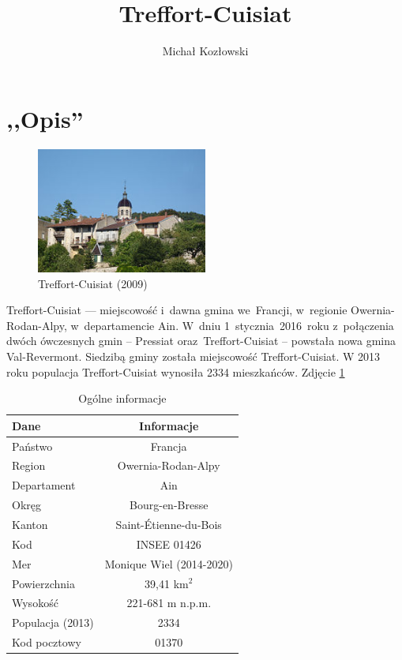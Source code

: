 \documentclass[a4paper,12pt]{article}
\title{Treffort-Cuisiat}
\author{Michał Kozłowski}
\begin{document}
\maketitle




\section{,,Opis''}

\begin{figure}
\centering
\includegraphics[width=0.5\textwidth]{grafika/obrazek.jpg}
\caption{Treffort-Cuisiat (2009)}
\label{fig:fotografia}
\end{figure}

Treffort-Cuisiat --- miejscowość i~dawna gmina we~Francji, w~regionie Owernia-Rodan-Alpy, w~departamencie Ain. W~dniu 1~stycznia~2016~roku z~połączenia dwóch ówczesnych gmin – Pressiat oraz~Treffort-Cuisiat – powstała nowa gmina Val-Revermont. Siedzibą gminy została miejscowość Treffort-Cuisiat. W 2013 roku populacja Treffort-Cuisiat wynosiła 2334 mieszkańców. Zdjęcie \ref{fig:fotografia}



\begin{table}
\centering
\begin{tabular}{lc}
\textbf{Dane}&\textbf{Informacje}\\
\hline
Państwo&Francja\\
Region&Owernia-Rodan-Alpy\\
Departament&Ain\\
Okręg&Bourg-en-Bresse\\
Kanton&Saint-Étienne-du-Bois\\
Kod&INSEE	01426\\
Mer&Monique Wiel (2014-2020)\\
Powierzchnia&39,41 km$^2$\\
Wysokość&221-681 m n.p.m.\\
Populacja (2013)&2334\\
Kod pocztowy&01370\\
\hline
\end{tabular}
\caption{Ogólne informacje}
\end{table}
\end{document}
